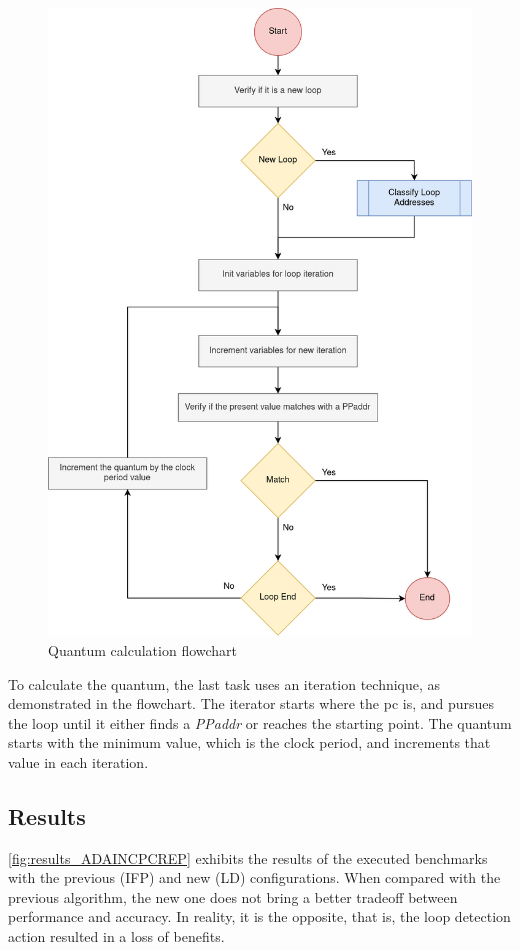 \begin{figure}[H]
	\centering
 	\includegraphics[width=0.5\linewidth]{Images/Repetition_flowchart_quantum.png}
 	\caption{Quantum calculation flowchart}
	 \label{fig_Repetition_flowchart_quantum}
\end{figure}

To calculate the quantum, the last task uses an iteration technique, as demonstrated in the flowchart. 
The iterator starts where the \gls{pc} is, and pursues the loop until it either finds a \textit{PPaddr} or reaches the starting point. 
The quantum starts with the minimum value, which is the clock period, and increments that value in each iteration.

\subsection{Results}

\autoref{fig:results_ADAINCPCREP} exhibits the results of the executed benchmarks with the previous (IFP) and new (LD) configurations. 
When compared with the previous algorithm, the new one does not bring a better tradeoff between performance and accuracy. 
In reality, it is the opposite, that is, the loop detection action resulted in a loss of benefits. 


